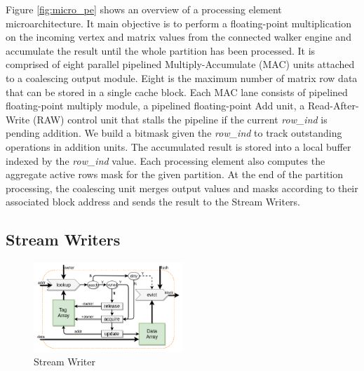 Figure \ref{fig:micro_pe} shows an overview of a processing element microarchitecture. It main objective is to perform a floating-point multiplication on the incoming vertex and matrix values from the connected walker engine and accumulate the result until the whole partition has been processed. It is comprised of eight parallel pipelined Multiply-Accumulate (MAC) units attached to a coalescing output module. Eight is the maximum number of matrix row data that can be stored in a single cache block. Each MAC lane consists of pipelined floating-point multiply module, a pipelined floating-point Add unit, a Read-After-Write (RAW) control unit that stalls the pipeline if the current \textit{row\_ind} is pending addition. We build a bitmask given the \textit{row\_ind} to track outstanding operations in addition units. The accumulated result is stored into a local buffer indexed by the \textit{row\_ind} value. Each processing element also computes the aggregate active rows mask for the given partition. At the end of the partition processing, the coalescing unit merges output values and masks according to their associated block address and sends the result to the Stream Writers.

\subsection{Stream Writers}

\begin{figure}[htbp]
\centering
\includegraphics[width=0.5\textwidth]{figures/micro_writer}
\caption{Stream Writer}
\label{fig:micro_writer}
\end{figure} 


